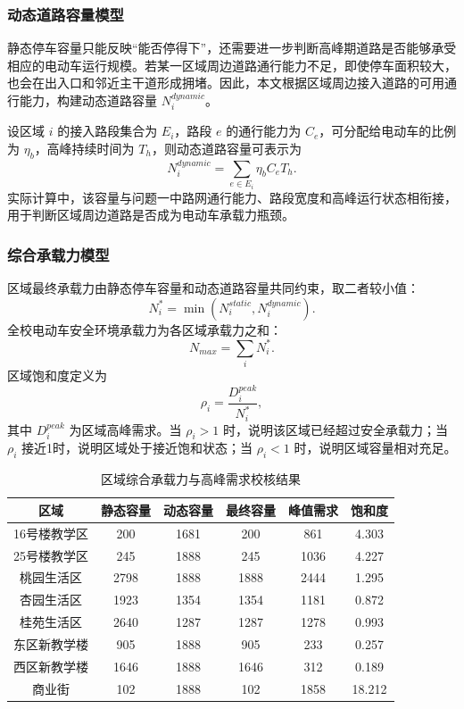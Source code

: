\documentclass[UTF8,zihao=-4,a4paper]{ctexart}
\begin{document}
\subsubsection{动态道路容量模型}

静态停车容量只能反映“能否停得下”，还需要进一步判断高峰期道路是否能够承受相应的电动车运行规模。若某一区域周边道路通行能力不足，即使停车面积较大，也会在出入口和邻近主干道形成拥堵。因此，本文根据区域周边接入道路的可用通行能力，构建动态道路容量 $N_i^{dynamic}$。

设区域 $i$ 的接入路段集合为 $E_i$，路段 $e$ 的通行能力为 $C_e$，可分配给电动车的比例为 $\eta_b$，高峰持续时间为 $T_h$，则动态道路容量可表示为
\begin{equation}
N_i^{dynamic}=\sum_{e\in E_i}\eta_b C_e T_h.
\end{equation}
实际计算中，该容量与问题一中路网通行能力、路段宽度和高峰运行状态相衔接，用于判断区域周边道路是否成为电动车承载力瓶颈。

\subsubsection{综合承载力模型}

区域最终承载力由静态停车容量和动态道路容量共同约束，取二者较小值：
\begin{equation}
N_i^*=\min\left(N_i^{static},N_i^{dynamic}\right).
\end{equation}
全校电动车安全环境承载力为各区域承载力之和：
\begin{equation}
N_{max}=\sum_i N_i^*.
\end{equation}
区域饱和度定义为
\begin{equation}
\rho_i=\frac{D_i^{peak}}{N_i^*},
\end{equation}
其中 $D_i^{peak}$ 为区域高峰需求。当 $\rho_i>1$ 时，说明该区域已经超过安全承载力；当 $\rho_i$ 接近1时，说明区域处于接近饱和状态；当 $\rho_i<1$ 时，说明区域容量相对充足。

\begin{table}[H]
\centering
\caption{区域综合承载力与高峰需求校核结果}
\label{tab:capacity_result}
\begin{tabular}{cccccc}
\toprule
\textbf{区域} & \textbf{静态容量} & \textbf{动态容量} & \textbf{最终容量} & \textbf{峰值需求} & \textbf{饱和度} \\
\midrule
16号楼教学区 & 200 & 1681 & 200 & 861 & 4.303 \\
25号楼教学区 & 245 & 1888 & 245 & 1036 & 4.227 \\
桃园生活区 & 2798 & 1888 & 1888 & 2444 & 1.295 \\
杏园生活区 & 1923 & 1354 & 1354 & 1181 & 0.872 \\
桂苑生活区 & 2640 & 1287 & 1287 & 1278 & 0.993 \\
东区新教学楼 & 905 & 1888 & 905 & 233 & 0.257 \\
西区新教学楼 & 1646 & 1888 & 1646 & 312 & 0.189 \\
商业街 & 102 & 1888 & 102 & 1858 & 18.212 \\
\bottomrule
\end{tabular}
\end{table}
\end{document}
